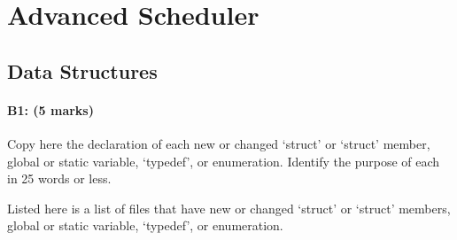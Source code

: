\section{Advanced Scheduler}
\subsection{Data Structures}
\paragraph{B1: (5 marks)}
Copy here the declaration of each new or changed `struct' or `struct' member,
global or static variable, `typedef', or enumeration.  Identify the purpose of
each in 25 words or less.

Listed here is a list of files that have new or changed `struct' or `struct'
members, global or static variable, `typedef', or enumeration.

